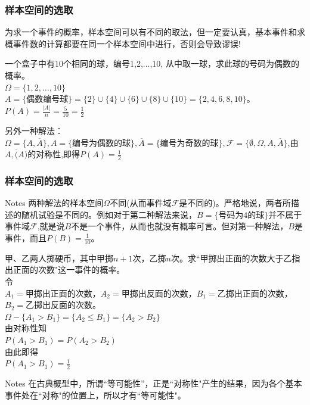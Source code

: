 \documentclass[xcolor=svgnames,serif,table,10pt]{beamer}
\begin{document}
\begin{frame}
\frametitle{样本空间的选取}
为求一个事件的概率，样本空间可以有不同的取法，但一定要认真，基本事件和求概事件数的计算都要在同一个样本空间中进行，否则会导致谬误!
\begin{example}
	一个盒子中有10个相同的球，编号1,2,...,10, 从中取一球，求此球的号码为偶数的概率。\\
	$\Omega=\{1,2,\dots,10\}$\\
	$A=\{\text{偶数编号球} \}=\{2\}\cup\{4\}\cup\{6\}\cup\{8\}\cup\{10\}=\{2,4,6,8,10\}$。\\
	$P(A)=\frac{|A|}{n}=\frac{5}{10}=\frac{1}{2}$
\end{example}
另外一种解法：$\Omega=\{A,\overline{A}\},A=\{\text{编号为偶数的球}\},\overline{A}=\{\text{编号为奇数的球}\},\mathcal{F}=\{\emptyset,\Omega,A,\overline{A}\}$,由$A,\overline(A)$的对称性,即得$P(A)=\frac{1}{2}$

\end{frame}

\begin{frame}
\frametitle{样本空间的选取}
\begin{block}{Notes}
	两种解法的样本空间$\Omega$不同(从而事件域$\mathcal{F}$是不同的)。严格地说，两者所描述的随机试验是不同的。例如对于第二种解法来说，$B=\{\text{号码为4的球}\}$并不属于事件域$\mathcal{F}$,就是说$B$不是一个事件，从而也就没有概率可言。但对第一种解法，$B$是事件，而且$P(B)=\frac{1}{10}$。
\end{block}

\end{frame}

\begin{frame}
\begin{example}
	甲、乙两人掷硬币，其中甲掷$n+1$次，乙掷$n$次。求``甲掷出正面的次数大于乙指出正面的次数"这一事件的概率。\\
	令\\ $A_1=$甲掷出正面的次数，$A_2=$甲掷出反面的次数，$B_1=$乙掷出正面的次数，$B_2=$乙掷出反面的次数。\\
	$\Omega-\{A_1 > B_1\}=\{A_2\le B_1\}=\{A_2>B_2\}$\\
	由对称性知\\
	$P(A_1>B_1)=P(A_2>B_2)$\\
	由此即得\\
	$P(A_1>B_1)=\frac{1}{2}$
\end{example}
\begin{block}{Notes}
	在古典概型中，所谓``等可能性''，正是``对称性"产生的结果，因为各个基本事件处在``对称"的位置上，所以才有``等可能性"。
\end{block}
\end{frame}
\end{document}
